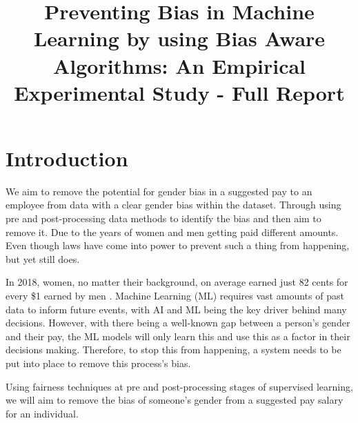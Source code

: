 \documentclass{sigchi}
\def\plaintitle{Preventing Bias in Machine Learning by using Bias Aware Algorithms: An Empirical Experimental Study - Full Report}
\begin{document}
\title{\plaintitle}

\author{%
}



\maketitle



\section{Introduction}

	We aim to remove the potential for gender bias in a suggested pay to an employee from data with a clear gender bias within the dataset. Through using pre and post-processing data methods to identify the bias and then aim to remove it. Due to the years of women and men getting paid different amounts. Even though laws have come into power to prevent such a thing from happening, but yet still does.

	In 2018, women, no matter their background, on average earned just 82 cents for every \$1 earned by men \cite{1}. Machine Learning (ML) requires vast amounts of past data to inform future events, with AI and ML being the key driver behind many decisions. However, with there being a well-known gap between a person's gender and their pay, the ML models will only learn this and use this as a factor in their decisions making. Therefore, to stop this from happening, a system needs to be put into place to remove this process's bias.

	Using fairness techniques at pre and post-processing stages \cite{three} of supervised learning, we will aim to remove the bias of someone's gender from a suggested pay salary for an individual. %


\end{document}
